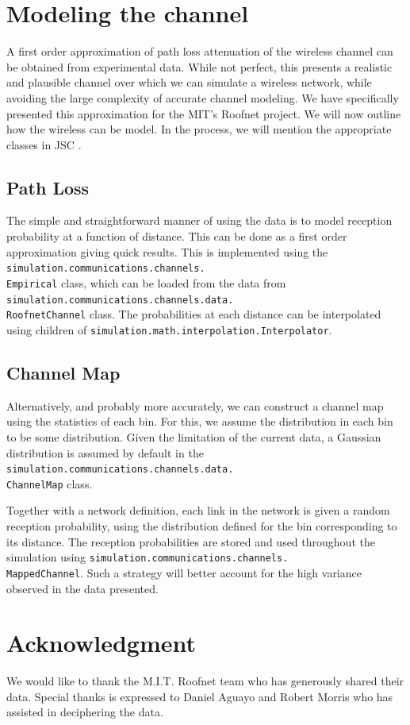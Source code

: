 \documentclass[11pt,twocolumn]{article}
\begin{document}
\section{Modeling the channel}
A first order approximation of path loss attenuation of the wireless channel can be obtained from experimental data.  While not perfect, this presents a realistic and plausible channel over which we can simulate a wireless network, while avoiding the large complexity of accurate channel modeling.  We have specifically presented this approximation for the MIT's Roofnet project.  We will now outline how the wireless can be model.  In the process, we will mention the appropriate classes in JSC \cite{jsc}.

\subsection{Path Loss}
The simple and straightforward manner of using the data is to model reception probability at a function of distance.  This can be done as a first order approximation giving quick results.  This is implemented using the {\small\texttt{simulation.communications.channels.\\Empirical}} class, which can be loaded from the data from {\small\texttt{simulation.communications.channels.data.\\RoofnetChannel}} class.  The probabilities at each distance can be interpolated using children of {\small\texttt{simulation.math.interpolation.Interpolator}}.

\subsection{Channel Map}
Alternatively, and probably more accurately, we can construct a channel map using the statistics of each bin.  For this, we assume the distribution in each bin to be some distribution.  Given the limitation of the current data, a Gaussian distribution is assumed by default in the {\small\texttt{simulation.communications.channels.data.\\ChannelMap}} class.

Together with a network definition, each link in the network is given a random reception probability, using the distribution defined for the bin corresponding to its distance.  The reception probabilities are stored and used throughout the simulation using {\small\texttt{simulation.communications.channels.\\MappedChannel}}.  Such a strategy will better account for the high variance observed in the data presented.

\section*{Acknowledgment}
We would like to thank the M.I.T. Roofnet team who has generously shared their data.  Special thanks is expressed to Daniel Aguayo and Robert Morris who has assisted in deciphering the data.



\end{document}
